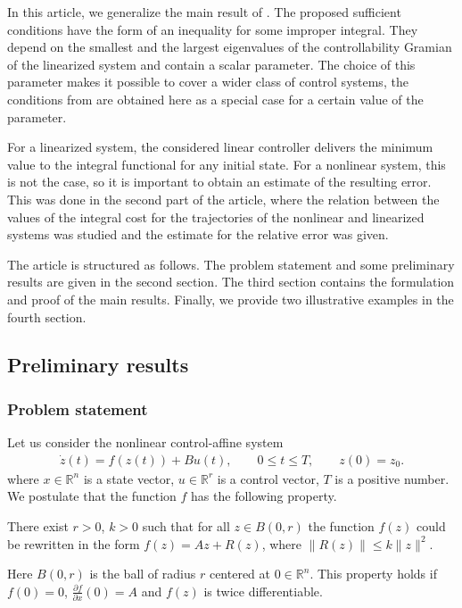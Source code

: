 \documentclass[../main.tex]{subfiles}
\begin{document}
In this article, we generalize the main result of \cite{GusevOsipov}. The proposed sufficient conditions have the form of an inequality for some improper integral. They depend on the smallest and the largest eigenvalues of the controllability Gramian of the linearized system and contain a scalar parameter. The choice of this parameter makes it possible to cover a wider class of control systems, the conditions from \cite{GusevOsipov} are obtained here as a special case for a certain value of the parameter.

For a linearized system, the considered linear controller delivers the minimum value to the integral functional for any initial state. For a nonlinear system, this is not the case, so it is important to obtain an estimate of the resulting error. This was done in the second part of the article, where  the relation between the values of the integral cost for the trajectories of the nonlinear and linearized systems was studied and  the estimate for the relative error was given. 

The article is structured as follows. The problem statement and some preliminary results are given in the second section. The third section contains the formulation and proof of the main results. Finally, we provide two illustrative examples in the fourth section.

\subsection{Preliminary results}
\subsubsection{Problem statement}

Let us consider the nonlinear  control-affine system
\begin{gather}\label{sec22:nonlinear}
	\dot{z}(t)=f(z(t))+B u(t),\qquad 0 \leqslant t \leqslant T, \qquad z(0) = z_0.
\end{gather}
 where $ x \in \mathbb{R}^n $ is a state vector, $ u \in \mathbb{R}^r $ is a control vector,  $ 
T$ is a positive number. We postulate that the function $f$ has the following property. 
\begin{property}\label{prop:Residial_term_bounds}
	 There exist  $r>0$, $k>0$  such that for all $ z \in B(0,r) $ the function $f(z)$ could be rewritten in the form $ f(z) = Az + R(z) $, where  $ \|R(z) \| \leqslant k \| z\|^2  $. 
\end{property}
Here $ B(0,r) $ is the ball of radius $r$  centered at $0 \in \mathbb{R}^n$. 
This property holds if $f(0) = 0 $, $\frac{\partial f}{\partial x}(0) 
= A $ and $f(z)$ is twice differentiable. 
\end{document}
